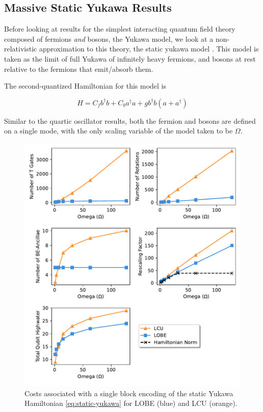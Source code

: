 \subsection{Massive Static Yukawa Results}
\label{sec:static_yukawa}

Before looking at results for the simplest interacting quantum field theory composed of fermions \textit{and} bosons, the Yukawa model, we look at a non-relativistic approximation to this theory, the static yukawa model \cite{PhysRevD.103.014021}.
This model is taken as the limit of full Yukawa of infinitely heavy fermions, and bosons at rest relative to the fermions that emit/absorb them.

The second-quantized Hamiltonian for this model is 

\begin{equation}
    \label{eq:static-yukawa}
    H = C_f b^\dagger b + C_b a^\dagger a + g b^\dagger b \left( a + a^\dagger \right)
\end{equation}
 
Similar to the quartic oscillator results, both the fermion and bosons are defined on a single mode, with the only scaling variable of the model taken to be $\Omega$.

\begin{figure}[h]
    \centering
    \includegraphics[width = 15cm]{figures/static_yukawa.pdf}
    \caption{Costs associated with a single block encoding of the static Yukawa Hamiltonian \ref{eq:static-yukawa} for LOBE (blue) and LCU (orange).}
    \label{fig:static_yukawa}
\end{figure}